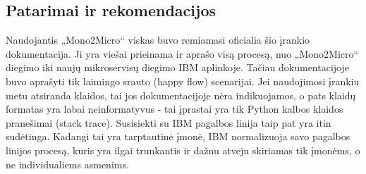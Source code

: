 \documentclass{VUMIFPSbakalaurinis}
\begin{document}
\subsection{Patarimai ir rekomendacijos} %
Naudojantis „Mono2Micro“ viskas buvo remiamasi oficialia šio įrankio dokumentacija. Ji yra viešai prieinama ir aprašo visą procesą, nuo „Mono2Micro“ diegimo iki naujų mikroservisų diegimo IBM aplinkoje. Tačiau dokumentacijoje buvo aprašyti tik laimingo srauto (happy flow) scenarijai. Jei naudojimosi įrankiu metu atsiranda klaidos, tai jos dokumentacijoje nėra indikuojamos, o pats klaidų formatas yra labai neinformatyvus - tai įprastai yra tik Python kalbos klaidos pranešimai (stack trace). Susisiekti su IBM pagalbos linija taip pat yra itin sudėtinga. Kadangi tai yra tarptautinė įmonė, IBM normalizuoja savo pagalbos linijos procesą, kuris yra ilgai trunkantis ir dažnu atveju skiriamas tik įmonėms, o ne individualiems asmenims.
\end{document}
